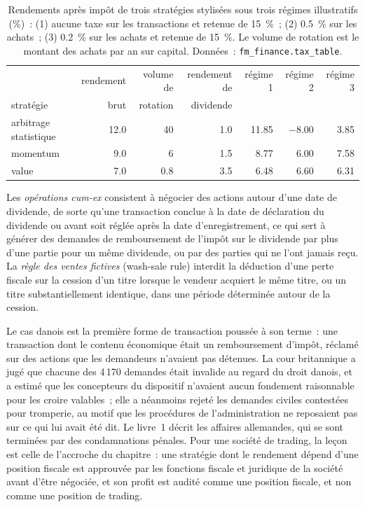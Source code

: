 \begin{table}[ht]
\centering\small
\begin{tabular}{lrrrrrr}
\toprule
 & rendement & volume de & rendement de & régime 1 & régime 2 & régime 3 \\
stratégie & brut & rotation & dividende & & & \\
\midrule
arbitrage statistique & 12.0 & 40 & 1.0 & 11.85 & $-$8.00 & 3.85 \\
momentum & 9.0 & 6 & 1.5 & 8.77 & 6.00 & 7.58 \\
value & 7.0 & 0.8 & 3.5 & 6.48 & 6.60 & 6.31 \\
\bottomrule
\end{tabular}
\caption{Rendements après impôt de trois stratégies stylisées sous trois régimes illustratifs (\%)~: (1) aucune taxe sur les transactions et retenue de 15~\%~;
(2) 0.5~\% sur les achats~; (3) 0.2~\% sur les achats et retenue de 15~\%. Le volume de rotation est le montant des achats par an sur capital. Données~: \texttt{fm\_finance.tax\_table}.}\label{tab:fm:finance-product-control-and-tax:tax}
\end{table}

\begin{definition}\label{def:fm:finance-product-control-and-tax:cumex}
Les \emph{opérations cum-ex} consistent à négocier des actions autour d'une date de dividende, de sorte qu'une transaction conclue à la date de déclaration du dividende ou avant
soit réglée après la date d'enregistrement, ce qui sert à générer des demandes de remboursement de l'impôt sur le dividende par plus d'une partie pour un même dividende,
ou par des parties qui ne l'ont jamais reçu. La \emph{règle des ventes fictives} (wash-sale rule) interdit la déduction d'une perte fiscale sur la cession d'un titre lorsque le vendeur
acquiert le même titre, ou un titre substantiellement identique, dans une période déterminée autour de la cession.
\end{definition}

Le cas danois est la première forme de transaction poussée à son terme~: une transaction dont le contenu économique était un remboursement d'impôt, réclamé sur des actions que les demandeurs
n'avaient pas détenues. La cour britannique a jugé que chacune des 4\,170 demandes était invalide au regard du droit danois, et a estimé que les concepteurs du dispositif n'avaient aucun fondement raisonnable pour
les croire valables~; elle a néanmoins rejeté les demandes civiles contestées pour tromperie, au motif que les procédures de l'administration ne reposaient pas sur
ce qui lui avait été dit. Le livre~1 décrit les affaires allemandes, qui se sont terminées par des condamnations pénales. Pour une société de trading, la leçon est celle de l'accroche du chapitre~: une stratégie
dont le rendement dépend d'une position fiscale est approuvée par les fonctions fiscale et juridique de la société avant d'être négociée, et son profit est audité comme une
position fiscale, et non comme une position de trading.

